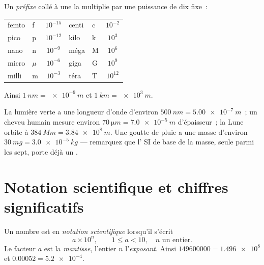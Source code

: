 \begin{definition}[Préfixes SI]\label{def:g10:orders-of-magnitude:prefixes}
Un \emph{préfixe} collé à une  la multiplie
par une puissance de dix fixe~:
\begin{center}
\begin{tabular}{llc@{\qquad\qquad}llc}
femto & f & $10^{-15}$ & centi & c & $10^{-2}$ \\
pico  & p & $10^{-12}$ & kilo  & k & $10^{3}$  \\
nano  & n & $10^{-9}$  & méga  & M & $10^{6}$  \\
micro & $\mu$ & $10^{-6}$ & giga & G & $10^{9}$ \\
milli & m & $10^{-3}$  & téra  & T & $10^{12}$ \\
\end{tabular}
\end{center}
Ainsi $\qty{1}{nm} = \qty{e-9}{m}$ et $\qty{1}{km} = \qty{e3}{m}$.
\end{definition}

\begin{example}\label{ex:g10:orders-of-magnitude:prefixes}
La lumière verte a une longueur d'onde d'environ
$\qty{500}{nm} = \qty{5.00e-7}{m}$~; un cheveu humain mesure environ
$\qty{70}{\micro m} = \qty{7.0e-5}{m}$ d'épaisseur~; la Lune orbite à
$\qty{384}{Mm} = \qty{3.84e8}{m}$. Une goutte de pluie a une masse
d'environ $\qty{30}{mg} = \qty{3.0e-5}{kg}$ --- remarquez que l'
SI de base de la masse, seule parmi les sept, porte déjà un .
\end{example}

\section{Notation scientifique et chiffres significatifs}

\begin{definition}\label{def:g10:orders-of-magnitude:scinot}
Un nombre est en \emph{notation scientifique} lorsqu'il s'écrit
\[
a \times 10^{n}, \qquad 1 \leq a < 10, \quad n \text{ un entier.}
\]
Le facteur $a$ est la \emph{mantisse}, l'entier $n$
l'\emph{exposant}.
Ainsi $\num{149600000} = \num{1.496e8}$ et
$\num{0.00052} = \num{5.2e-4}$.
\end{definition}

